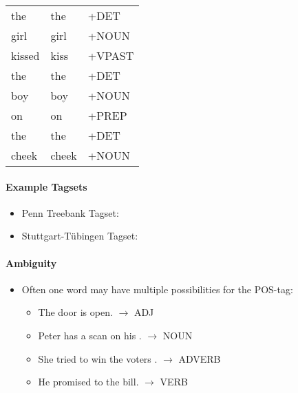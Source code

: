 \begin{itemize}
\begin{table}[H]
\begin{tabular}{l l l}
								the           & the                 & +DET             \\
								girl          & girl                & +NOUN            \\
								kissed        & kiss                & +VPAST           \\
								the           & the                 & +DET             \\
								boy           & boy                 & +NOUN            \\
								on            & on                  & +PREP            \\
								the           & the                 & +DET             \\
								cheek         & cheek               & +NOUN
							\end{tabular}
						\end{table}
				\end{itemize}

				\paragraph{Example Tagsets} %
					\begin{itemize}
						\item Penn Treebank Tagset: 
						\item Stuttgart-Tübingen Tagset: 
					\end{itemize}

				\paragraph{Ambiguity} %
					\begin{itemize}
						\item Often one word may have multiple possibilities for the POS-tag:
							\begin{itemize}
								\item The  door is open. \( \rightarrow \) ADJ
								\item Peter has a scan on his . \( \rightarrow \) NOUN
								\item She tried to win the voters . \( \rightarrow \) ADVERB
								\item He promised to  the bill. \( \rightarrow \) VERB
							\end{itemize}
					\end{itemize}

